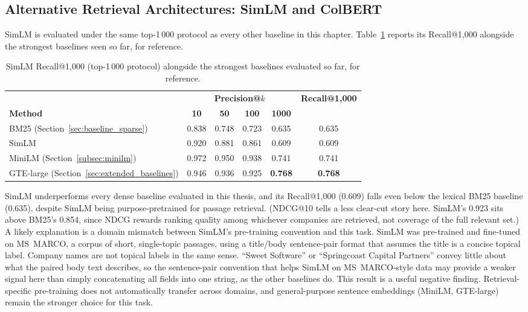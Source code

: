 \documentclass[a4paper,oneside,bibliography=totoc]{scrbook}
\begin{document}
\subsection{Alternative Retrieval Architectures: SimLM and ColBERT}
\label{sec:simlm_result}

SimLM is evaluated under the same top-1\,000 protocol as every other baseline in this chapter. Table~\ref{tab:simlm} reports its Recall@1{,}000 alongside the strongest baselines seen so far, for reference.

\begin{table}[ht]
\centering
\caption{SimLM Recall@1{,}000 (top-1\,000 protocol) alongside the
         strongest baselines evaluated so far, for reference.}
\label{tab:simlm}
\begin{tabular}{lccccc}
\toprule
& \multicolumn{4}{c}{\textbf{Precision@$k$}} & \textbf{Recall@1{,}000} \\
\cmidrule(lr){2-5}
\textbf{Method} & \textbf{10} & \textbf{50} & \textbf{100} & \textbf{1000} & \\
\midrule
BM25 (Section~\ref{sec:baseline_sparse})         & 0.838 & 0.748 & 0.723 & 0.635 & 0.635 \\
SimLM                                            & 0.920 & 0.881 & 0.861 & 0.609 & 0.609 \\
MiniLM (Section~\ref{subsec:minilm})             & 0.972 & 0.950 & 0.938 & 0.741 & 0.741 \\
GTE-large (Section~\ref{sec:extended_baselines}) & 0.946 & 0.936 & 0.925 & \textbf{0.768} & \textbf{0.768} \\
\bottomrule
\end{tabular}
\end{table}

SimLM underperforms every dense baseline evaluated in this thesis, and its Recall@1{,}000 (0.609) falls even below the lexical BM25 baseline (0.635), despite SimLM being purpose-pretrained for passage retrieval. (NDCG@10 tells a less clear-cut story here. SimLM's 0.923 sits above BM25's 0.854, since NDCG rewards ranking quality among whichever companies are retrieved, not coverage of the full relevant set.) A likely explanation is a domain mismatch between SimLM's pre-training convention and this task. SimLM was pre-trained and fine-tuned on MS~MARCO, a corpus of short, single-topic passages, using a title/body sentence-pair format that assumes the title is a concise topical label. Company names are not topical labels in the same sense. ``Sweet Software'' or ``Springcoast Capital Partners'' convey little about what the paired body text describes, so the sentence-pair convention that helps SimLM on MS~MARCO-style data may provide a weaker signal here than simply concatenating all fields into one string, as the other baselines do. This result is a useful negative finding. Retrieval-specific pre-training does not automatically transfer across domains, and general-purpose sentence embeddings (MiniLM, GTE-large) remain the stronger choice for this task.
\end{document}

